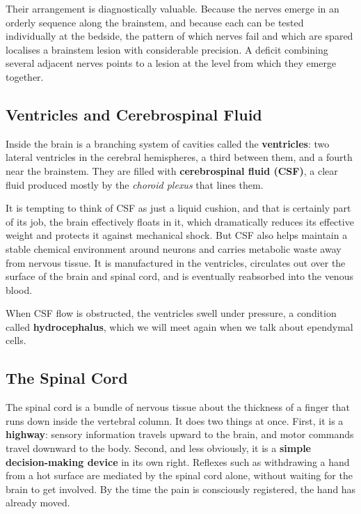 \documentclass[11pt]{article}
\begin{document}
Their arrangement is diagnostically valuable. Because the nerves emerge in an orderly sequence along the brainstem, and because each can be tested individually at the bedside, the pattern of which nerves fail and which are spared localises a brainstem lesion with considerable precision. A deficit combining several adjacent nerves points to a lesion at the level from which they emerge together.

\subsection{Ventricles and Cerebrospinal Fluid}

Inside the brain is a branching system of cavities called the \textbf{ventricles}: two lateral ventricles in the cerebral hemispheres, a third between them, and a fourth near the brainstem. They are filled with \textbf{cerebrospinal fluid (CSF)}, a clear fluid produced mostly by the \textit{choroid plexus} that lines them.

It is tempting to think of CSF as just a liquid cushion, and that is certainly part of its job, the brain effectively floats in it, which dramatically reduces its effective weight and protects it against mechanical shock. But CSF also helps maintain a stable chemical environment around neurons and carries metabolic waste away from nervous tissue. It is manufactured in the ventricles, circulates out over the surface of the brain and spinal cord, and is eventually reabsorbed into the venous blood.

When CSF flow is obstructed, the ventricles swell under pressure, a condition called \textbf{hydrocephalus}, which we will meet again when we talk about ependymal cells.

\subsection{The Spinal Cord}

The spinal cord is a bundle of nervous tissue about the thickness of a finger that runs down inside the vertebral column. It does two things at once. First, it is a \textbf{highway}: sensory information travels upward to the brain, and motor commands travel downward to the body. Second, and less obviously, it is a \textbf{simple decision-making device} in its own right. Reflexes such as withdrawing a hand from a hot surface are mediated by the spinal cord alone, without waiting for the brain to get involved. By the time the pain is consciously registered, the hand has already moved.
\end{document}
